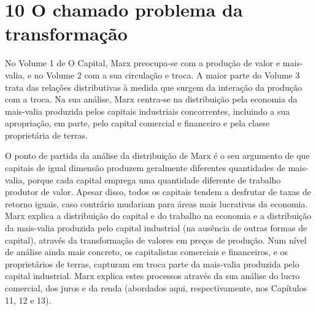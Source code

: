 \chapter{10 O chamado problema da transformação}\label{10 O chamado problema da transformação}
 \par 
No Volume {\color{blue}1} de O Capital, Marx preocupa-se com a produção de valor e mais-valia, e no Volume {\color{blue}2} com a sua circulação e troca. A maior parte do Volume {\color{blue}3} trata das relações distributivas à medida que surgem da interação da produção com a troca. Na sua análise, Marx centra-se na distribuição pela economia da mais-valia produzida pelos capitais industriais concorrentes, incluindo a sua apropriação, em parte, pelo capital comercial e financeiro e pela classe proprietária de terras.
 \par 
O ponto de partida da análise da distribuição de Marx é o seu argumento de que capitais de igual dimensão produzem geralmente diferentes quantidades de mais-valia, porque cada capital emprega uma quantidade diferente de trabalho produtor de valor. Apesar disso, todos os capitais tendem a desfrutar de taxas de retorno iguais, caso contrário mudariam para áreas mais lucrativas da economia. Marx explica a distribuição do capital e do trabalho na economia e a distribuição da mais-valia produzida pelo capital industrial (na ausência de outras formas de capital), através da transformação de valores em preços de produção. Num nível de análise ainda mais concreto, os capitalistas comerciais e financeiros, e os proprietários de terras, capturam em troca parte da mais-valia produzida pelo capital industrial. Marx explica estes processos através da sua análise do lucro comercial, dos juros e da renda (abordados aqui, respectivamente, nos Capítulos 11, {\color{blue}12} e {\color{blue}13}).
 \par 
